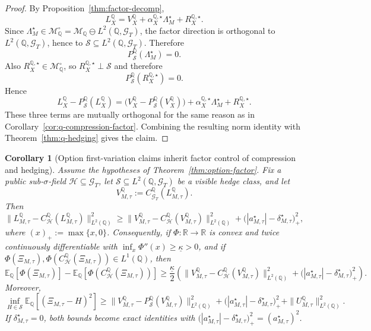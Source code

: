 \documentclass[11pt,a4paper]{amsart}
\theoremstyle{plain}
\newtheorem{corollary}[theorem]{Corollary}
\theoremstyle{definition}
\theoremstyle{remark}
\newcommand{\R}{\mathbb{R}}
\newcommand{\QQ}{\mathbb{Q}}
\newcommand{\EE}{\mathbb{E}}
\newcommand{\cG}{\mathcal{G}}
\newcommand{\cH}{\mathcal{H}}
\newcommand{\cM}{\mathcal{M}}
\newcommand{\cS}{\mathcal{S}}
\begin{document}
\begin{proof}
By Proposition~\ref{thm:factor-decomp},
\[
        L_X^\QQ
        =
        V_X^\QQ+\alpha_X^{\QQ,\star}\Lambda_M^\star+R_X^{\QQ,\star}.
\]
Since \(\Lambda_M^\star\in\cM_\QQ^\circ=\cM_\QQ\ominus L^2(\QQ,\cG_T)\), the factor direction is
orthogonal to \(L^2(\QQ,\cG_T)\), hence to \(\cS\subseteq L^2(\QQ,\cG_T)\).  Therefore
\[
        P_{\cS}^\QQ(\Lambda_M^\star)=0.
\]
Also \(R_X^{\QQ,\star}\in \cM_\QQ^\circ\), so \(R_X^{\QQ,\star}\perp \cS\) and therefore
\[
        P_{\cS}^\QQ(R_X^{\QQ,\star})=0.
\]
Hence
\[
        L_X^\QQ-P_{\cS}^\QQ(L_X^\QQ)
        =
        \bigl(V_X^\QQ-P_{\cS}^\QQ(V_X^\QQ)\bigr)
        +
        \alpha_X^{\QQ,\star}\Lambda_M^\star
        +
        R_X^{\QQ,\star}.
\]
These three terms are mutually orthogonal for the same reason as in
Corollary~\ref{cor:q-compression-factor}.  Combining the resulting norm identity with
Theorem~\ref{thm:q-hedging} gives the claim.
\end{proof}

\begin{corollary}[Option first-variation claims inherit factor control of compression and hedging]\label{cor:option-factor-residuals}
Assume the hypotheses of Theorem~\ref{thm:option-factor}.  Fix a public
sub-\(\sigma\)-field \(\cH\subseteq\cG_T\), let \(\cS\subseteq L^2(\QQ,\cG_T)\) be a visible hedge
class, and let
\[
        V_{M,\tau}^\QQ:=C_{\cG_T}^\QQ(L_{M,\tau}^\QQ).
\]
Then
\[
        \|L_{M,\tau}^\QQ-C_{\cH}^\QQ(L_{M,\tau}^\QQ)\|_{L^2(\QQ)}^2
        \ge
        \|V_{M,\tau}^\QQ-C_{\cH}^\QQ(V_{M,\tau}^\QQ)\|_{L^2(\QQ)}^2
        +
        \bigl(|a_{M,\tau}^\star|-\delta_{M,\tau}^\star\bigr)_+^2,
\]
where \((x)_+:=\max\{x,0\}\).  Consequently, if \(\Phi\colon\R\to\R\) is convex and twice
continuously differentiable with \(\inf_x\Phi''(x)\ge \underline\kappa>0\), and if
\(\Phi(\Xi_{M,\tau}),\Phi(C_{\cH}^\QQ(\Xi_{M,\tau}))\in L^1(\QQ)\), then
\[
        \EE_\QQ[\Phi(\Xi_{M,\tau})]
        -
        \EE_\QQ[\Phi(C_{\cH}^\QQ(\Xi_{M,\tau}))]
        \ge
        \frac{\underline\kappa}{2}
        \left(
                \|V_{M,\tau}^\QQ-C_{\cH}^\QQ(V_{M,\tau}^\QQ)\|_{L^2(\QQ)}^2
                +
                \bigl(|a_{M,\tau}^\star|-\delta_{M,\tau}^\star\bigr)_+^2
        \right).
\]
Moreover,
\[
        \inf_{H\in\cS}\EE_\QQ[(\Xi_{M,\tau}-H)^2]
        \ge
        \|V_{M,\tau}^\QQ-P_{\cS}^\QQ(V_{M,\tau}^\QQ)\|_{L^2(\QQ)}^2
        +
        \bigl(|a_{M,\tau}^\star|-\delta_{M,\tau}^\star\bigr)_+^2
        +
        \|U_{M,\tau}^\QQ\|_{L^2(\QQ)}^2.
\]
If \(\delta_{M,\tau}^\star=0\), both bounds become exact identities with
\(\bigl(|a_{M,\tau}^\star|-\delta_{M,\tau}^\star\bigr)_+^2=(a_{M,\tau}^\star)^2\).
\end{corollary}
\end{document}
